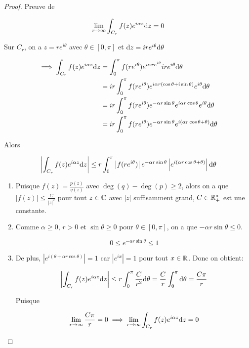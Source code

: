 \begin{proof}
    Preuve de
    
    \[ \lim_{r \rightarrow \infty} \int_{C_r} f(z) e^{i\alpha z} \mathrm{d}z = 0 \]
    
    Sur $C_r$, on a $z = r e^{i\theta}$ avec $\theta \in [0,\pi]$ et $\mathrm{d}z = i r e^{i\theta} \mathrm{d}\theta$
    
    \begin{align*}
        \implies \int_{C_r} f(z) e^{i\alpha z} \mathrm{d}z
        &= \int_0^\pi f(r e^{i\theta}) e^{i\alpha r e^{i\theta}} i r e^{i\theta} \mathrm{d}\theta
        \\&= ir \int_0^\pi f(r e^{i\theta}) e^{i\alpha r (\cos \theta + i \sin \theta)} e^{i\theta} \mathrm{d}\theta
        \\&= ir \int_0^\pi f(r e^{i\theta}) e^{-\alpha r\sin \theta}e^{i\alpha r \cos \theta} e^{i\theta} \mathrm{d}\theta
        \\&= ir \int_0^\pi f(r e^{i\theta}) e^{-\alpha r\sin \theta}e^{i \left(\alpha r \cos \theta + \theta\right)} \mathrm{d}\theta
    \end{align*}
    
    Alors
    
    \[
        \left| \int_{C_r} f(z) e^{i\alpha z} \mathrm{d}z \right|
        \leq r \int_0^\pi \left| f(r e^{i\theta}) \right| e^{-\alpha r\sin \theta} \left| e^{i \left(\alpha r \cos \theta + \theta\right)} \right| \mathrm{d}\theta
    \]
    
    \begin{enumerate}
        \item 
        Puisque $f(z) = \frac{p(z)}{q(z)}$ avec $\deg(q) - \deg(p) \geq 2$, alors on a que $\left|f(z)\right| \leq \frac{C}{|z|^2}$ pour tout $z \in \mathbb{C}$ avec $|z|$ suffisamment grand, $C \in \mathbb{R}^\ast_+$ est une constante.
        
        \item 
        Comme $\alpha \geq 0$, $r > 0$ et $\sin \theta \geq 0$ pour $\theta \in [0, \pi]$, on a que $-\alpha r \sin \theta \leq 0$.
        
        \[ 0 \leq e^{-\alpha r \sin \theta} \leq 1 \]
        
        \item 
        De plus, $\left| e^{i(\theta + \alpha r \cos \theta)} \right| = 1$ car $\left|e^{ix}\right| = 1$ pour tout $x \in \mathbb{R}$.
        Donc on obtient:
        
        \[
            \left| \int_{C_r} f(z) e^{i\alpha z} \mathrm{d}z \right|
            \leq r \int_0^\pi \frac{C}{r^2} \mathrm{d}\theta = \frac{C}{r} \int_0^\pi \mathrm{d}\theta = \frac{C\pi}{r}
        \]
        
        Puisque 
        
        \[
            \lim_{r \rightarrow \infty} \frac{C\pi}{r} = 0 \implies \lim_{r \rightarrow \infty} \int_{C_r} f(z) e^{i\alpha z} \mathrm{d}z = 0
        \]
    \end{enumerate}
\end{proof}
